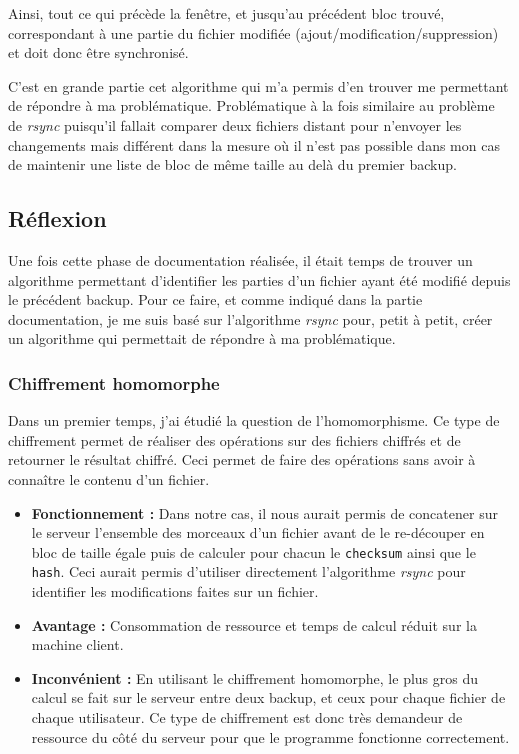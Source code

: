 \documentclass[a4paper,10pt, twoside]{report}
\begin{document}
\begin{spacing}{1.2}
Ainsi, tout ce qui pr\'ec\`ede la fen\^etre, et jusqu'au pr\'ec\'edent bloc
trouv\'e, correspondant \`a une partie du fichier modifi\'ee
(ajout/modification/suppression) et doit donc \^etre synchronis\'e.

C'est en grande partie cet algorithme qui m'a permis d'en trouver me permettant
de r\'epondre \`a ma probl\'ematique. Probl\'ematique \`a la fois similaire au
probl\`eme de \textit{rsync} puisqu'il fallait comparer deux fichiers distant
pour n'envoyer les changements mais diff\'erent dans la mesure o\`u il n'est
pas possible dans mon cas de maintenir une liste de bloc de m\^eme taille au
del\`a du premier backup.

\subsection{R\'eflexion}
Une fois cette phase de documentation r\'ealis\'ee, il \'etait temps de trouver
un algorithme permettant d'identifier les parties d'un fichier ayant \'et\'e
modifi\'e depuis le pr\'ec\'edent backup. Pour ce faire, et comme indiqu\'e
dans la partie documentation, je me suis bas\'e sur l'algorithme \textit{rsync}
pour, petit \`a petit, cr\'eer un algorithme qui permettait de r\'epondre \`a ma
probl\'ematique.

\subsubsection{Chiffrement homomorphe}
Dans un premier temps, j'ai \'etudi\'e la question de l'homomorphisme. Ce type
de chiffrement permet de r\'ealiser des op\'erations sur des fichiers chiffr\'es
et de retourner le r\'esultat chiffr\'e. Ceci permet de faire des op\'erations
sans avoir \`a conna\^itre le contenu d'un fichier.

\begin{itemize}
 \item \textbf{Fonctionnement :} Dans notre cas, il nous aurait permis de
 concatener sur le serveur l'ensemble des morceaux d'un fichier avant de le
 re-d\'ecouper en bloc de taille \'egale puis de calculer pour chacun le
 \texttt{checksum} ainsi que le \texttt{hash}. Ceci aurait permis d'utiliser
 directement l'algorithme \textit{rsync} pour identifier les modifications
 faites sur un fichier.

 \item \textbf{Avantage :} Consommation de ressource et temps de calcul
 r\'eduit sur la machine client.
 
 \item \textbf{Inconv\'enient :} En utilisant le chiffrement homomorphe, le
 plus gros du calcul se fait sur le serveur entre deux backup, et ceux pour
 chaque fichier de chaque utilisateur. Ce type de chiffrement est donc tr\`es
 demandeur de ressource du c\^ot\'e du serveur pour que le programme fonctionne
 correctement.


\end{itemize}
\end{spacing}
\end{document}

